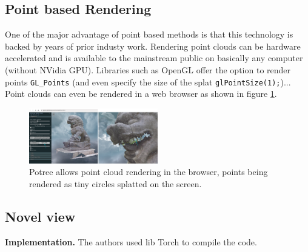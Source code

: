\subsection{Point based Rendering}
\label{subsec:Point based Rendering}
One of the major advantage of point based methods is that this technology is backed by years of prior industy work. Rendering point clouds can be hardware accelerated and is available to the mainstream public on basically any computer (without NVidia GPU). Libraries such as OpenGL offer the option to render points \texttt{GL\_Points} (and even specify the size of the splat \texttt{glPointSize(1);})... Point clouds can even be rendered in a web browser as shown in figure \ref{fig:potree}.


\begin{figure}[htbp]
    \centering
    \includegraphics[width=0.5\textwidth]{figures/potree_rendering_and_splat.png}
    \caption{Potree \cite{potree} allows point cloud rendering in the browser, points being rendered as tiny circles splatted on the screen.}
    \label{fig:potree}
\end{figure}



\subsection{Novel view}
\label{subsec:Projecting points}



\noindent\textbf{Implementation.} The authors used lib Torch to compile the code. 


